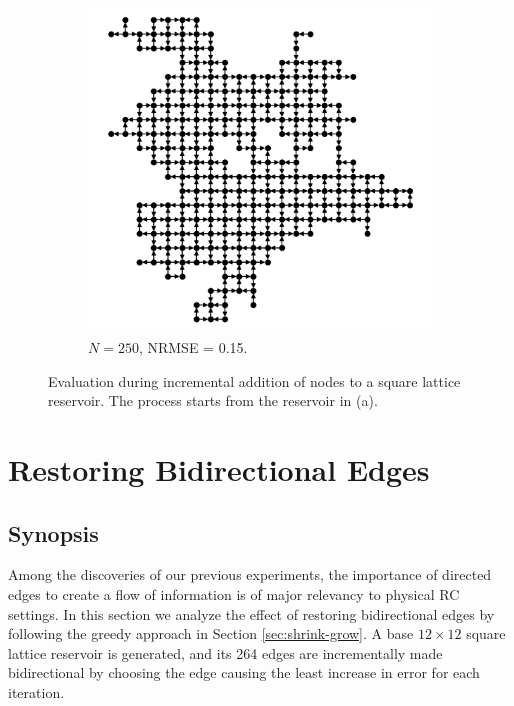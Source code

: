 \begin{figure}[htb]
\begin{subfigure}{.49\textwidth}
\includegraphics[width=1.0\linewidth]{figures/sq-grid-grow-250.png}
    \caption{$N = 250$, NRMSE = 0.15.}
    \label{fig:sq-grid-grow-250}
  \end{subfigure}
  \caption{
    Evaluation during incremental addition of nodes to a square lattice
reservoir. The process starts from the reservoir in (a).
  }
  \label{fig:sq-grid-grow}
\end{figure}

\section{Restoring Bidirectional Edges}

\subsection{Synopsis}

Among the discoveries of our previous experiments, the importance of directed
edges to create a flow of information is of major relevancy to physical RC
settings. In this section we analyze the effect of restoring bidirectional edges
by following the greedy approach in Section \ref{sec:shrink-grow}. A base $12
\times 12$ square lattice reservoir is generated, and its 264 edges are
incrementally made bidirectional by choosing the edge causing the least increase
in error for each iteration.

